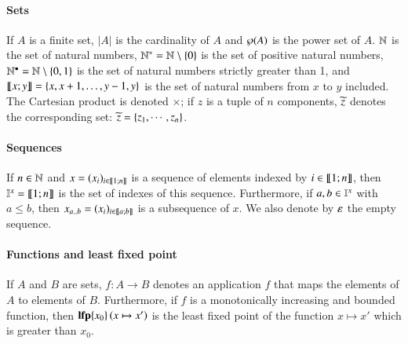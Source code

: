 \paragraph*{Sets}
If $A$ is a finite set,
$|A|$ is the cardinality of $A$
and $\wp(A)$ is the power set of $A$.
$\mathbb{N}$ is the set of natural numbers,
$\mathbb{N}^* = \mathbb{N} \setminus \{ 0 \}$ is the set of positive natural numbers,
$\mathbb{N}^\bullet = \mathbb{N} \setminus \{ 0, 1 \}$ is the set of natural numbers strictly greater than 1,
and $\llbracket x; y \rrbracket = \{ x, x+1, \dots, y-1, y \}$ is the set of natural numbers from $x$ to $y$ included.
The Cartesian product is denoted $\times$;
if $z$ is a tuple of $n$ components, $\widetilde{z}$ denotes the corresponding set:
$\widetilde{z} = \{z_1, \cdots, z_n\}$.

\paragraph*{Sequences}
If $n \in \mathbb{N}$ and
$x = (x_i)_{i \in \llbracket 1; n \rrbracket}$ is a sequence of elements indexed by $i \in \llbracket 1; n \rrbracket$,
then $\mathbb{I}^{x} = \llbracket 1; n \rrbracket$ is the set of indexes of this sequence.
Furthermore, if $a, b \in \mathbb{I}^{x}$ with $a \leq b$,
then $x_{a..b} = (x_i)_{i \in \llbracket a; b \rrbracket}$ is a subsequence of $x$.
We also denote by $\varepsilon$ the empty sequence.

\paragraph*{Functions and least fixed point}
If $A$ and $B$ are sets,
$f : A \rightarrow B$ denotes an application $f$ that maps the elements of $A$ to elements of $B$.
Furthermore, if $f$ is a monotonically increasing and bounded function, then
$\mathbf{lfp}\{x_0\}\left(x\mapsto x'\right)$ is the least fixed point of the function $x \mapsto x'$ which is greater than $x_0$.
